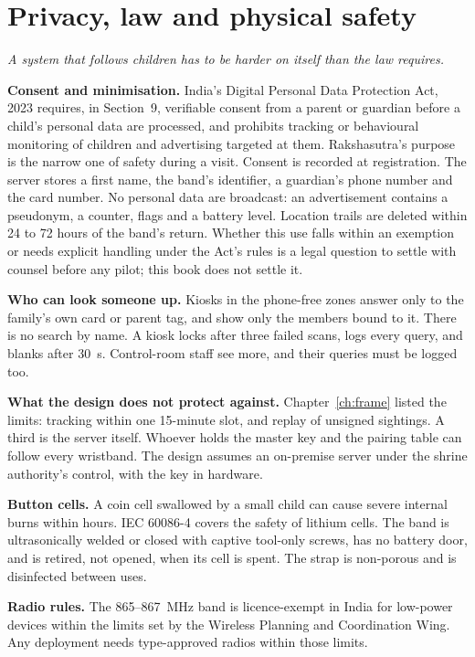 \documentclass[11pt,a4paper,twoside,openany]{book}
\newcommand{\hook}[1]{{\noindent\fontsize{13}{19}\selectfont\itshape\color{rsmuted}#1\par}\vspace{12pt}}
\begin{document}
\chapter{Privacy, law and physical safety}\label{ch:law}
\hook{A system that follows children has to be harder on itself than the law requires.}
\textbf{Consent and minimisation.} India's Digital Personal Data Protection Act, 2023 requires, in Section~9,
verifiable consent from a parent or guardian before a child's personal data are processed, and prohibits tracking or
behavioural monitoring of children and advertising targeted at them. Rakshasutra's purpose is the narrow one of
safety during a visit. Consent is recorded at registration. The server stores a first name, the band's identifier, a
guardian's phone number and the card number. No personal data are broadcast: an advertisement contains a pseudonym, a
counter, flags and a battery level. Location trails are deleted within 24 to 72 hours of the band's return. Whether
this use falls within an exemption or needs explicit handling under the Act's rules is a legal question to settle
with counsel before any pilot; this book does not settle it.

\textbf{Who can look someone up.} Kiosks in the phone-free zones answer only to the family's own card or parent tag,
and show only the members bound to it. There is no search by name. A kiosk locks after three failed scans, logs every
query, and blanks after 30~s. Control-room staff see more, and their queries must be logged too.

\textbf{What the design does not protect against.} Chapter~\ref{ch:frame} listed the limits: tracking within one
15-minute slot, and replay of unsigned sightings. A third is the server itself. Whoever holds the master key and the
pairing table can follow every wristband. The design assumes an on-premise server under the shrine authority's
control, with the key in hardware.

\textbf{Button cells.} A coin cell swallowed by a small child can cause severe internal burns within hours. IEC
60086-4 covers the safety of lithium cells. The band is ultrasonically welded or closed with captive tool-only screws,
has no battery door, and is retired, not opened, when its cell is spent. The strap is non-porous and is disinfected
between uses.

\textbf{Radio rules.} The 865--867~MHz band is licence-exempt in India for low-power devices within the limits set by
the Wireless Planning and Coordination Wing. Any deployment needs type-approved radios within those limits.
\end{document}
